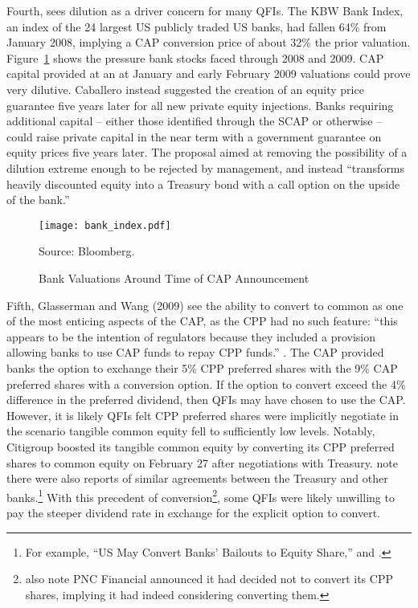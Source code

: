 \documentclass[12pt]{article}
\begin{document}
Fourth, \citet{Caballero} sees dilution as a driver concern for many QFIs. The KBW Bank Index, an index of the 24 largest US publicly traded US banks, had fallen 64\% from January 2008, implying a CAP conversion price of about 32\% the prior valuation. Figure~\ref{figure2} shows the pressure bank stocks faced through 2008 and 2009. CAP capital provided at an at January and early February 2009 valuations could prove very dilutive. Caballero instead suggested the creation of an equity price guarantee five years later for all new private equity injections. Banks requiring additional capital -- either those identified through the SCAP or otherwise -- could raise private capital in the near term with a government guarantee on equity prices five years later. The proposal aimed at removing the possibility of a dilution extreme enough to be rejected by management, and instead “transforms heavily discounted equity into a Treasury bond with a call option on the upside of the bank.''

\begin{figure}[h]
\caption{Bank Valuations Around Time of CAP Announcement}\label{figure2}
\centering
\texttt{[image: bank\_index.pdf]}
\raggedright
\footnotesize Source: Bloomberg.
\end{figure}

Fifth, Glasserman and Wang (2009) see the ability to convert to common as one of the most enticing aspects of the CAP, as the CPP had no such feature: “this appears to be the intention of regulators because they included a provision allowing banks to use CAP funds to repay CPP funds.'' \citep{GW}. The CAP provided banks the option to exchange their 5\% CPP preferred shares with the 9\% CAP preferred shares with a conversion option. If the option to convert exceed the 4\% difference in the preferred dividend, then QFIs may have chosen to use the CAP. However, it is likely QFIs felt CPP preferred shares were implicitly negotiate in the scenario tangible common equity fell to sufficiently low levels. Notably, Citigroup boosted its tangible common equity by converting its CPP preferred shares to common equity on February 27 after negotiations with Treasury. \citet{GW} note there were also reports of similar agreements between the Treasury and other banks.\footnote{For example, ``US May Convert Banks' Bailouts to Equity Share,'' \citep{Andrews} and \citep{GW}.} With this precedent of conversion\footnote{\citet{GW} also note PNC Financial announced it had decided not to convert its CPP shares, implying it had indeed considering converting them.}, some QFIs were likely unwilling to pay the steeper dividend rate in exchange for the explicit option to convert.
\end{document}
